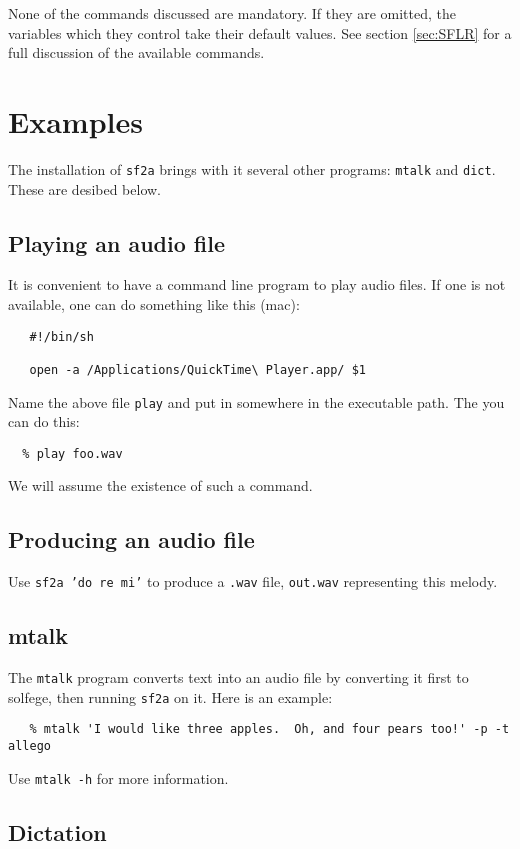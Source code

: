 \documentclass[11pt]{amsart}
\begin{document}
None of the commands discussed are mandatory.  If they are omitted, the variables which they
control take their default values.  See section \ref{sec:SFLR} for a full discussion of the
available commands.

\section{Examples}

The installation of {\tt sf2a} brings with it several other programs: {\tt mtalk} and
{\tt dict}.  These are desibed below.

\subsection{Playing an audio file}

It is convenient to have a command line program to play audio files.
If one is not available, one can do something like this (mac):
\begin{verbatim}
   #!/bin/sh

   open -a /Applications/QuickTime\ Player.app/ $1
\end{verbatim}
Name the above file {\tt play} and put in somewhere in the executable path.
The you can do this:
\begin{verbatim}
  % play foo.wav
\end{verbatim}
We will assume the existence of such a command.

\subsection{Producing an audio file}

Use {\tt sf2a 'do re mi'} to produce a {\tt .wav} file, {\tt out.wav}
representing this melody.

\subsection{mtalk}

The {\tt mtalk} program converts text into an audio file by converting
it first to solfege, then running {\tt sf2a} on it.  Here is an example:
\begin{verbatim}
   % mtalk 'I would like three apples.  Oh, and four pears too!' -p -t allego
\end{verbatim}
Use {\tt mtalk -h} for more information.


\subsection{Dictation}
\end{document}
